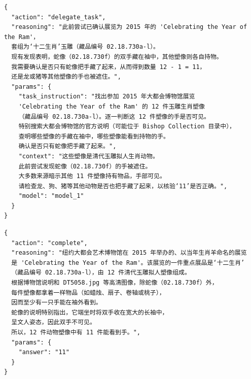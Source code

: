 \begin{tcolorbox}[
  title={\textbf{\small 尝试 9 - 主智能体决策}},
  boxrule=1pt,
  arc=0mm,
  colback=gray!5,
  colframe=gray!70,
  breakable,
  before skip=10pt,
  after skip=10pt,
  pad at break=2mm,
  parbox=false
]
\begin{verbatim}
{
  "action": "delegate_task",
  "reasoning": "此前尝试已确认展览为 2015 年的 'Celebrating the Year of the Ram'，
  套组为‘十二生肖’玉雕（藏品编号 02.18.730a-l）。
  现有发现表明，蛇像（02.18.730f）的双手藏在袖中，其他塑像则各自持物。
  我需要确认是否只有蛇像把手藏了起来，从而得到数量 12 - 1 = 11，
  还是龙或猪等其他塑像的手也被遮住。",
  "params": {
    "task_instruction": "找出参加 2015 年大都会博物馆展览
    'Celebrating the Year of the Ram' 的 12 件玉雕生肖塑像
    （藏品编号 02.18.730a-l）。逐一判断这 12 件塑像的手是否可见。
    特别搜索大都会博物馆的官方说明（可能位于 Bishop Collection 目录中），
    查明哪些塑像的手藏在袖中，哪些塑像能看到持物的手。
    确认是否只有蛇像把手藏了起来。",
    "context": "这些塑像是清代玉雕拟人生肖动物。
    此前尝试发现蛇像（02.18.730f）的手被遮住。
    大多数来源暗示其他 11 件塑像持有物品，手部可见。
    请检查龙、狗、猪等其他动物是否也把手藏了起来，以核验‘11’是否正确。",
    "model": "model_1"
  }
}
\end{verbatim}
\end{tcolorbox}

\begin{tcolorbox}[
  title={\textbf{\small 尝试 10 - 主智能体决策（最终）}},
  boxrule=1pt,
  arc=0mm,
  colback=black!5,
  colframe=black!70,
  breakable,
  before skip=10pt,
  after skip=10pt,
  pad at break=2mm,
  parbox=false
]
\begin{verbatim}
{
  "action": "complete",
  "reasoning": "纽约大都会艺术博物馆在 2015 年举办的、以当年生肖羊命名的展览
  是 'Celebrating the Year of the Ram'。该展览的一件重点展品是‘十二生肖’
  （藏品编号 02.18.730a-l），由 12 件清代玉雕拟人塑像组成。
  根据博物馆说明和 DT5058.jpg 等高清图像，除蛇像（02.18.730f）外，
  每件塑像都拿着一样物品（如蜡烛、扇子、卷轴或桃子），
  因而至少有一只手能在袖外看到。
  蛇像的说明特别指出，它端坐时将双手收在宽大的长袖中，
  呈文人姿态，因此双手不可见。
  所以，12 件动物塑像中有 11 件能看到手。",
  "params": {
    "answer": "11"
  }
}
\end{verbatim}
\end{tcolorbox}



